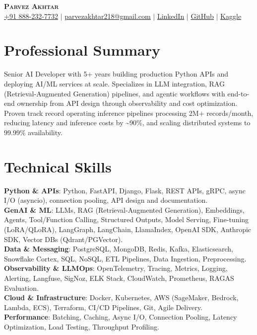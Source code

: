 \documentclass[11pt,a4paper]{article}
\begin{document}
\begin{center}
    \textbf{\Huge \scshape Parvez Akhtar} \\ \vspace{1pt}
    \small \href{tel:+918882327732}{+91 888-232-7732} $|$ \href{mailto:parvezakhtar218@gmail.com}{\underline{parvezakhtar218@gmail.com}} $|$
    \href{https://www.linkedin.com/in/parvezakhtar/}{\underline{LinkedIn}} $|$
    \href{https://github.com/ipmob}{\underline{GitHub}} $|$
    \href{https://www.kaggle.com/parvez218}{\underline{Kaggle}}
\end{center}

\section{Professional Summary}
\small{Senior AI Developer with 5+ years building production Python APIs and deploying AI/ML services at scale. Specializes in LLM integration, RAG (Retrieval-Augmented Generation) pipelines, and agentic workflows with end-to-end ownership from API design through observability and cost optimization. Proven track record operating inference pipelines processing 2M+ records/month, reducing latency and inference costs by \textasciitilde{}90\%, and scaling distributed systems to 99.99\% availability.}

\section{Technical Skills}
 \begin{itemize}[leftmargin=0.15in, label={}]
    \small{\item{
     \textbf{Python \& APIs}{: Python, FastAPI, Django, Flask, REST APIs, gRPC, async I/O (asyncio), connection pooling, API design and documentation.} \\
     \textbf{GenAI \& ML}{: LLMs, RAG (Retrieval-Augmented Generation), Embeddings, Agents, Tool/Function Calling, Structured Outputs, Model Serving, Fine-tuning (LoRA/QLoRA), LangGraph, LangChain, LlamaIndex, OpenAI SDK, Anthropic SDK, Vector DBs (Qdrant/PGVector).} \\
     \textbf{Data \& Messaging}{: PostgreSQL, MongoDB, Redis, Kafka, Elasticsearch, Snowflake Cortex, SQL, NoSQL, ETL Pipelines, Data Ingestion, Preprocessing.} \\
     \textbf{Observability \& LLMOps}{: OpenTelemetry, Tracing, Metrics, Logging, Alerting, Langfuse, SigNoz, ELK Stack, CloudWatch, Prometheus, RAGAS Evaluation.} \\
     \textbf{Cloud \& Infrastructure}{: Docker, Kubernetes, AWS (SageMaker, Bedrock, Lambda, ECS), Terraform, CI/CD Pipelines, Git, Agile Delivery.} \\
     \textbf{Performance}{: Batching, Caching, Async I/O, Connection Pooling, Latency Optimization, Load Testing, Throughput Profiling.}
    }}
 \end{itemize}
\end{document}

